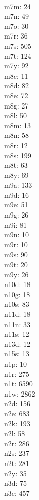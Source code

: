 \begin{multicols}{8}
  \\m7m: 24
  \\m7n: 49
  \\m7o: 30
  \\m7r: 36
  \\m7s: 505
  \\m7t: 124
  \\m7y: 92
  \\m8c: 11
  \\m8d: 82
  \\m8e: 72
  \\m8g: 27
  \\m8l: 50
  \\m8m: 13
  \\m8n: 58
  \\m8r: 12
  \\m8s: 199
  \\m8t: 63
  \\m8y: 69
  \\m9a: 133
  \\m9d: 16
  \\m9e: 51
  \\m9g: 26
  \\m9i: 81
  \\m9n: 10
  \\m9r: 10
  \\m9s: 90
  \\m9t: 20
  \\m9y: 26
  \\n10d: 18
  \\n10g: 18
  \\n10s: 83
  \\n11d: 18
  \\n11n: 33
  \\n11s: 12
  \\n13d: 12
  \\n15s: 13
  \\n1p: 10
  \\n1r: 275
  \\n1t: 6590
  \\n1w: 2862
  \\n2d: 156
  \\n2e: 683
  \\n2k: 193
  \\n2l: 58
  \\n2r: 286
  \\n2s: 237
  \\n2t: 281
  \\n2y: 35
  \\n3d: 75
  \\n3e: 457

\end{multicols}
